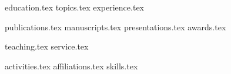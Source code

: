 \documentclass[letterpaper,11pt]{article}
\begin{document}


{education.tex}
{topics.tex}
{experience.tex}


\pagebreak
{publications.tex}
{manuscripts.tex}
{presentations.tex}
{awards.tex}


{teaching.tex}
{service.tex}


{activities.tex}
{affiliations.tex}
{skills.tex}


\pagebreak
\end{document}
